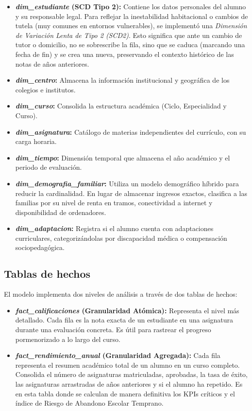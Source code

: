 \begin{itemize}
    \item \textbf{\textit{dim\_estudiante} (SCD Tipo 2):} Contiene los datos personales del alumno y su responsable legal. Para reflejar la inestabilidad habitacional o cambios de tutela (muy comunes en entornos vulnerables), se implementó una \textit{Dimensión de Variación Lenta de Tipo 2 (SCD2)}. Esto significa que ante un cambio de tutor o domicilio, no se sobrescribe la fila, sino que se caduca (marcando una fecha de fin) y se crea una nueva, preservando el contexto histórico de las notas de años anteriores.
    \item \textbf{\textit{dim\_centro}:} Almacena la información institucional y geográfica de los colegios e institutos.
    \item \textbf{\textit{dim\_curso}:} Consolida la estructura académica (Ciclo, Especialidad y Curso).
    \item \textbf{\textit{dim\_asignatura}:} Catálogo de materias independientes del currículo, con su carga horaria.
    \item \textbf{\textit{dim\_tiempo}:} Dimensión temporal que almacena el año académico y el periodo de evaluación.
    \item \textbf{\textit{dim\_demografia\_familiar}:} Utiliza un modelo demográfico híbrido para reducir la cardinalidad. En lugar de almacenar ingresos exactos, clasifica a las familias por su nivel de renta en tramos, conectividad a internet y disponibilidad de ordenadores.
    \item \textbf{\textit{dim\_adaptacion}:} Registra si el alumno cuenta con adaptaciones curriculares, categorizándolas por discapacidad médica o compensación sociopedagógica.
\end{itemize}

\subsection{Tablas de hechos}

El modelo implementa dos niveles de análisis a través de dos tablas de hechos:

\begin{itemize}
    \item \textbf{\textit{fact\_calificaciones} (Granularidad Atómica):} Representa el nivel más detallado. Cada fila es la nota exacta de un estudiante en una asignatura durante una evaluación concreta. Es útil para rastrear el progreso pormenorizado a lo largo del curso.
    \item \textbf{\textit{fact\_rendimiento\_anual} (Granularidad Agregada):} Cada fila representa el resumen académico total de un alumno en un curso completo. Consolida el número de asignaturas matriculadas, aprobadas, la tasa de éxito, las asignaturas arrastradas de años anteriores y si el alumno ha repetido. Es en esta tabla donde se calculan de manera definitiva los KPIs críticos y el índice de Riesgo de Abandono Escolar Temprano.
\end{itemize}

